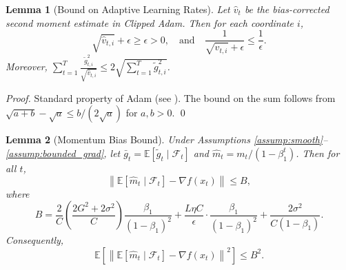\documentclass{article}
\newtheorem{lemma}{Lemma}
\newcommand{\E}{\mathbb{E}}
\newcommand{\norm}[1]{\left\| #1 \right\|}
\begin{document}
\begin{lemma}[Bound on Adaptive Learning Rates] \label{lem:adaptive_bound}
    Let $\hat{v}_t$ be the bias-corrected second moment estimate in Clipped Adam. Then for each coordinate $i$,
    \[
        \sqrt{\hat{v}_{t,i}} + \epsilon \ge \epsilon > 0, \quad \text{and} \quad \frac{1}{\sqrt{\hat{v}_{t,i}} + \epsilon} \le \frac{1}{\epsilon}.
    \]
    Moreover, $\sum_{t=1}^T \frac{\tilde{g}_{t,i}^2}{\sqrt{\hat{v}_{t,i}}} \le 2 \sqrt{\sum_{t=1}^T \tilde{g}_{t,i}^2}$.
\end{lemma}
\begin{proof}
    Standard property of Adam (see \cite{kingma2014adam}). The bound on the sum follows from $\sqrt{a+b} - \sqrt{a} \le b/(2\sqrt{a})$ for $a,b>0$. \qed
\end{proof}

\begin{lemma}[Momentum Bias Bound] \label{lem:momentum_bias}
    Under Assumptions \ref{assump:smooth}--\ref{assump:bounded_grad}, let $\bar{g}_t = \E[\tilde{g}_t \mid \mathcal{F}_t]$ and $\hat{m}_t = m_t/(1-\beta_1^t)$. Then for all $t$,
    \[
        \norm{\E[\hat{m}_t \mid \mathcal{F}_t] - \nabla f(x_t)} \le B,
    \]
    where
    \[
        B = \frac{2}{C}\left(\frac{2G^2+2\sigma^2}{C}\right)\frac{\beta_1}{(1-\beta_1)^2} + \frac{L \eta C}{\epsilon} \cdot \frac{\beta_1}{(1-\beta_1)^2} + \frac{2\sigma^2}{C(1-\beta_1)}.
    \]
    Consequently,
    \[
        \E\left[ \norm{\E[\hat{m}_t \mid \mathcal{F}_t] - \nabla f(x_t)}^2 \right] \le B^2.
    \]
\end{lemma}
\end{document}
